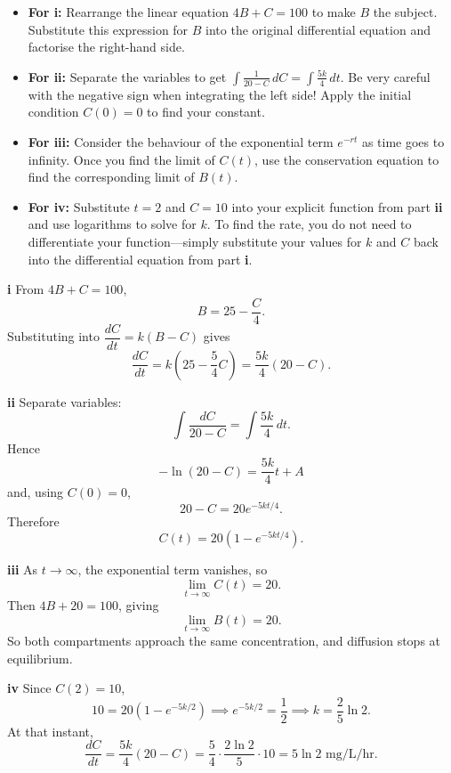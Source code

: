 \begin{hint}
\begin{itemize}
    \item \textbf{For i:} Rearrange the linear equation $4B + C = 100$ to make $B$ the subject. Substitute this expression for $B$ into the original differential equation and factorise the right-hand side.
    \item \textbf{For ii:} Separate the variables to get $\int \frac{1}{20 - C} \, dC = \int \frac{5k}{4} \, dt$. Be very careful with the negative sign when integrating the left side! Apply the initial condition $C(0) = 0$ to find your constant.
    \item \textbf{For iii:} Consider the behaviour of the exponential term $e^{-rt}$ as time goes to infinity. Once you find the limit of $C(t)$, use the conservation equation to find the corresponding limit of $B(t)$.
    \item \textbf{For iv:} Substitute $t=2$ and $C=10$ into your explicit function from part \textbf{ii} and use logarithms to solve for $k$. To find the rate, you do not need to differentiate your function—simply substitute your values for $k$ and $C$ back into the differential equation from part \textbf{i}.
\end{itemize}
\end{hint}

\begin{solution}
\textbf{i} From $4B+C=100$,
\[
B=25-\frac C4.
\]
Substituting into $\dfrac{dC}{dt}=k(B-C)$ gives
\[
\frac{dC}{dt}=k\left(25-\frac54C\right)=\frac{5k}{4}(20-C).
\]

\textbf{ii} Separate variables:
\[
\int \frac{dC}{20-C}=\int \frac{5k}{4}\,dt.
\]
Hence
\[
-\ln(20-C)=\frac{5k}{4}t+A
\]
and, using $C(0)=0$,
\[
20-C=20e^{-5kt/4}.
\]
Therefore
\[
\boxed{C(t)=20\left(1-e^{-5kt/4}\right)}.
\]

\textbf{iii} As $t\to\infty$, the exponential term vanishes, so
\[
\lim_{t\to\infty}C(t)=20.
\]
Then $4B+20=100$, giving
\[
\lim_{t\to\infty}B(t)=20.
\]
So both compartments approach the same concentration, and diffusion stops at equilibrium.

\textbf{iv} Since $C(2)=10$,
\[
10=20\left(1-e^{-5k/2}\right)
\implies e^{-5k/2}=\frac12
\implies \boxed{k=\frac{2}{5}\ln 2}.
\]
At that instant,
\[
\frac{dC}{dt}=\frac{5k}{4}(20-C)
=\frac{5}{4}\cdot \frac{2\ln 2}{5}\cdot 10
=\boxed{5\ln 2\text{ mg/L/hr}}.
\]
\end{solution}

